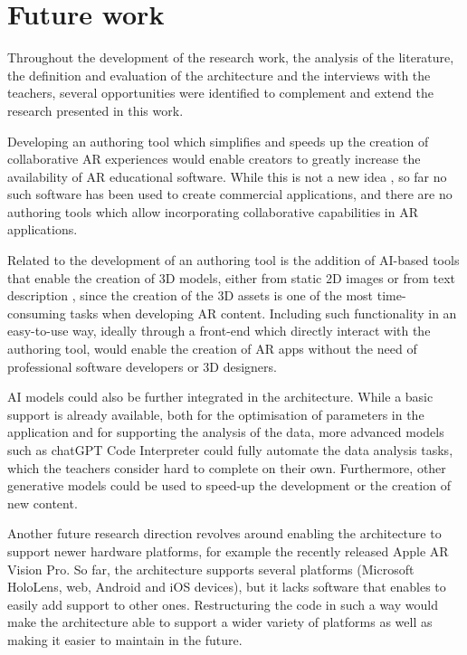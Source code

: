 \section{Future work}
Throughout the development of the research work, the analysis of the literature, the definition and evaluation of the architecture and the interviews with the teachers, several opportunities were identified to complement and extend the research presented in this work.

Developing an authoring tool which simplifies and speeds up the creation of collaborative AR experiences would enable creators to greatly increase the availability of AR educational software. While this is not a new idea \citep{rajaram2022paper, thanyadit2022easy}, so far no such software has been used to create commercial applications, and there are no authoring tools which allow incorporating collaborative capabilities in AR applications.

Related to the development of an authoring tool is the addition of AI-based tools that enable the creation of 3D models, either from static 2D images \citep{mildenhall2021nerf} or from text description \citep{poole2022dreamfusion, deitke2023objaversexl}, since the creation of the 3D assets is one of the most time-consuming tasks when developing AR content. Including such functionality in an easy-to-use way, ideally through a front-end which directly interact with the authoring tool, would enable the creation of AR apps without the need of professional software developers or 3D designers.

AI models could also be further integrated in the architecture. While a basic support is already available, both for the optimisation of parameters in the application and for supporting the analysis of the data, more advanced models such as chatGPT Code Interpreter \citep{openai2023gpt4} could fully automate the data analysis tasks, which the teachers consider hard to complete on their own. Furthermore, other generative models could be used to speed-up the development or the creation of new content.

Another future research direction revolves around enabling the \arch{} architecture to support newer hardware platforms, for example the recently released Apple AR Vision Pro. So far, the architecture supports several platforms (Microsoft HoloLens, web, Android and iOS devices), but it lacks software that enables to easily add support to other ones. Restructuring the code in such a way would make the architecture able to support a wider variety of platforms as well as making it easier to maintain in the future. 

